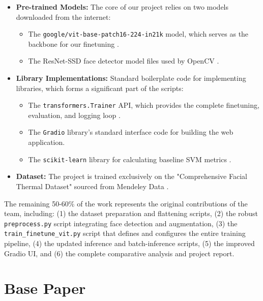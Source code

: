\documentclass[12pt,a4paper]{report}
\begin{document}
\begin{itemize}
    \item \textbf{Pre-trained Models:} The core of our project relies on two models downloaded from the internet:
    \begin{itemize}
        \item The \texttt{google/vit-base-patch16-224-in21k} model, which serves as the backbone for our finetuning \cite{vit, huggingface_vit}.
        \item The ResNet-SSD face detector model files used by OpenCV \cite{ssd_detector}.
    \end{itemize}

    \item \textbf{Library Implementations:} Standard boilerplate code for implementing libraries, which forms a significant part of the scripts:
    \begin{itemize}
        \item The \texttt{transformers.Trainer} API, which provides the complete finetuning, evaluation, and logging loop \cite{huggingface_vit}.
        \item The \texttt{Gradio} library's standard interface code for building the web application.
        \item The \texttt{scikit-learn} library for calculating baseline SVM metrics \cite{svm}.
    \end{itemize}

    \item \textbf{Dataset:} The project is trained exclusively on the "Comprehensive Facial Thermal Dataset" sourced from Mendeley Data \cite{mendeley_dataset}.
\end{itemize}

The remaining 50-60\% of the work represents the original contributions of the team, including: (1) the dataset preparation and flattening scripts, (2) the robust \texttt{preprocess.py} script integrating face detection and augmentation, (3) the \texttt{train\_finetune\_vit.py} script that defines and configures the entire training pipeline, (4) the updated inference and batch-inference scripts, (5) the improved Gradio UI, and (6) the complete comparative analysis and project report.

\clearpage
\chapter{Base Paper}
\label{sec:Base Paper}
\end{document}
